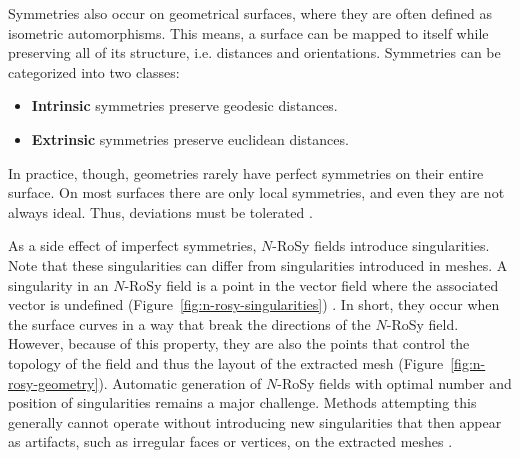 \documentclass{ACGSeminar}
\begin{document}
Symmetries also occur on geometrical surfaces, where they are often defined as isometric automorphisms. This means, a surface can be mapped to itself while preserving all of its structure, i.e. distances and orientations. Symmetries can be categorized into two classes:
\begin{itemize}
	\item	\textbf{Intrinsic} symmetries preserve geodesic distances.
	\item	\textbf{Extrinsic} symmetries preserve euclidean distances.
\end{itemize}
In practice, though, geometries rarely have perfect symmetries on their entire surface. On most surfaces there are only local symmetries, and even they are not always ideal. Thus, deviations must be tolerated \cite{panozzo2012fields}.\bigskip

As a side effect of imperfect symmetries, $N$-RoSy fields introduce singularities. Note that these singularities can differ from singularities introduced in meshes. A singularity in an $N$-RoSy field is a point in the vector field where the associated vector is undefined (Figure~\ref{fig:n-rosy-singularities}) \cite{palacios2007rotational}. In short, they occur when the surface curves in a way that break the directions of the $N$-RoSy field. However, because of this property, they are also the points that control the topology of the field and thus the layout of the extracted mesh (Figure~\ref{fig:n-rosy-geometry}). Automatic generation of $N$-RoSy fields with optimal number and position of singularities remains a major challenge. Methods attempting this generally cannot operate without introducing new singularities that then appear as artifacts, such as irregular faces or vertices, on the extracted meshes \cite{lai2009metric}.
\end{document}
